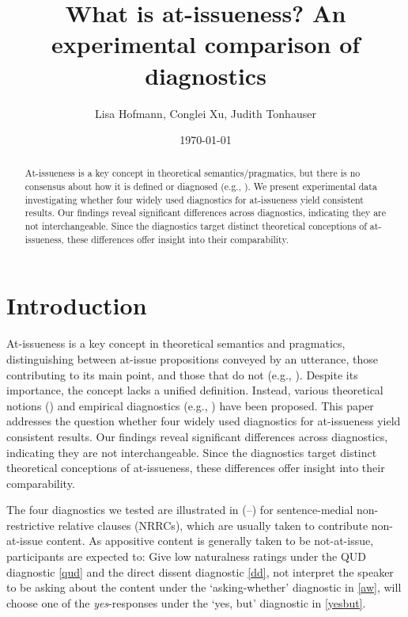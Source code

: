 \documentclass[12pt]{article}
\title{What is at-issueness? An experimental comparison of diagnostics}
\author{\normalsize Lisa Hofmann, Conglei Xu, Judith Tonhauser}
\date{\small\today}
\begin{document}
\maketitle
\begin{abstract}
  At-issueness is a key concept in theoretical semantics/pragmatics, but there is no consensus about how it is defined or diagnosed (e.g., \citealt{tonhauser_diagnosing_2012,tonhauser_how_2018,koev_notions_2018}). We present experimental data investigating whether four widely used diagnostics for at-issueness yield consistent results. Our findings reveal significant differences across diagnostics, indicating they are not interchangeable. Since the diagnostics target distinct theoretical conceptions of at-issueness, these differences offer insight into their comparability.
\end{abstract}
\setcounter{tocdepth}{2}
\tableofcontents
\pagebreak


\section{Introduction}
\label{sec:1_introduction}
  
  At-issueness is a key concept in theoretical semantics and pragmatics, distinguishing between at-issue propositions conveyed by an utterance, those contributing to its main point, and those that do not (e.g., \citealt{karttunen_conventional_1979,horton_presuppositions_1988,abbott_presuppositions_2000,faller_semantics_2003,potts_logic_2005,tonhauser_diagnosing_2012}). Despite its importance, the concept lacks a unified definition. Instead, various theoretical notions (\citealt{koev_notions_2018,tonhauser_how_2018}) and empirical diagnostics (e.g., \citealt{tonhauser_diagnosing_2012}) have been proposed. This paper addresses the question whether four widely used diagnostics for at-issueness yield consistent results. Our findings reveal significant differences across diagnostics, indicating they are not interchangeable. Since the diagnostics target distinct theoretical conceptions of at-issueness, these differences offer insight into their comparability.

  The four diagnostics we tested are illustrated in (--) for sentence-medial non-restrictive relative clauses (NRRCs), which are usually taken to contribute non-at-issue content.  As appositive content is generally taken to be not-at-issue, participants are expected to: Give low naturalness ratings under the QUD diagnostic \ref{qud} and the direct dissent diagnostic \ref{dd}, not interpret the speaker to be asking about the content under the `asking-whether' diagnostic in \ref{aw}, will choose one of the \emph{yes}-responses under the `yes, but' diagnostic in \ref{yesbut}.
\end{document}
